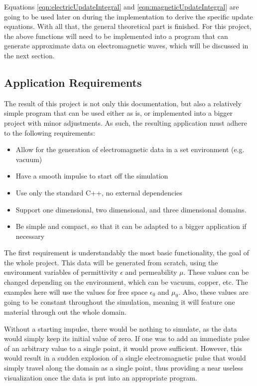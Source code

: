 Equations \ref{eqn:electricUpdateIntegral} and \ref{eqn:magneticUpdateIntegral} are going to be used later on during the implementation to derive the specific update equations. With all that, the general theoretical part is finished. For this project, the above functions will need to be implemented into a program that can generate approximate data on electromagnetic waves, which will be discussed in the next section.

\subsection{Application Requirements}

The result of this project is not only this documentation, but also a relatively simple program that can be used either as is, or implemented into a bigger project with minor adjustments. As such, the resulting application must adhere to the following requirements:

\begin{itemize}
	\item Allow for the generation of electromagnetic data in a set environment (e.g. vacuum)
	\item Have a smooth impulse to start off the simulation
	\item Use only the standard C++, no external dependencies
	\item Support one dimensional, two dimensional, and three dimensional domains.
	\item Be simple and compact, so that it can be adapted to a bigger application if necessary
\end{itemize}

The first requirement is understandably the most basic functionality, the goal of the whole project. This data will be generated from scratch, using the environment variables of permittivity $\epsilon$ and permeability $\mu$. These values can be changed depending on the environment, which can be vacuum, copper, etc. The examples here will use the values for free space $\epsilon_{0}$ and $\mu_{0}$. Also, these values are going to be constant throughout the simulation, meaning it will feature one material through out the whole domain. 

Without a starting impulse, there would be nothing to simulate, as the data would simply keep its initial value of zero. If one was to add an immediate pulse of an arbitrary value to a single point, it would prove sufficient. However, this would result in a sudden explosion of a single electromagnetic pulse that would simply travel along the domain as a single point, thus providing a near useless visualization once the data is put into an appropriate program. 

